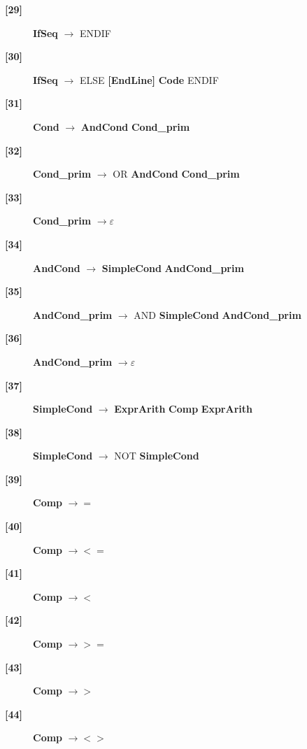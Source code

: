 \documentclass[12pt]{article}
\begin{document}
\begin{description}
\item[\textbf{[29]}]{ \textbf{\textlangle{}IfSeq\textrangle{}}  $\rightarrow$ ENDIF}
\item[\textbf{[30]}]{ \textbf{\textlangle{}IfSeq\textrangle{}}  $\rightarrow$ ELSE \textbf{[EndLine]} \textbf{\textlangle{}Code\textrangle{}}  ENDIF}
\item[\textbf{[31]}]{ \textbf{\textlangle{}Cond\textrangle{}}  $\rightarrow$ \textbf{\textlangle{}AndCond\textrangle{}}  \textbf{\textlangle{}Cond\_prim\textrangle{}} }
\item[\textbf{[32]}]{ \textbf{\textlangle{}Cond\_prim\textrangle{}}  $\rightarrow$ OR \textbf{\textlangle{}AndCond\textrangle{}}  \textbf{\textlangle{}Cond\_prim\textrangle{}} }
\item[\textbf{[33]}]{ \textbf{\textlangle{}Cond\_prim\textrangle{}}  $\rightarrow \varepsilon$}
\item[\textbf{[34]}]{ \textbf{\textlangle{}AndCond\textrangle{}}  $\rightarrow$ \textbf{\textlangle{}SimpleCond\textrangle{}}  \textbf{\textlangle{}AndCond\_prim\textrangle{}} }
\item[\textbf{[35]}]{ \textbf{\textlangle{}AndCond\_prim\textrangle{}}  $\rightarrow$ AND \textbf{\textlangle{}SimpleCond\textrangle{}}  \textbf{\textlangle{}AndCond\_prim\textrangle{}} }
\item[\textbf{[36]}]{ \textbf{\textlangle{}AndCond\_prim\textrangle{}}  $\rightarrow \varepsilon$}
\item[\textbf{[37]}]{ \textbf{\textlangle{}SimpleCond\textrangle{}}  $\rightarrow$ \textbf{\textlangle{}ExprArith\textrangle{}}  \textbf{\textlangle{}Comp\textrangle{}}  \textbf{\textlangle{}ExprArith\textrangle{}} }
\item[\textbf{[38]}]{ \textbf{\textlangle{}SimpleCond\textrangle{}}  $\rightarrow$ NOT \textbf{\textlangle{}SimpleCond\textrangle{}} }
\item[\textbf{[39]}]{ \textbf{\textlangle{}Comp\textrangle{}}  $\rightarrow =$}
\item[\textbf{[40]}]{ \textbf{\textlangle{}Comp\textrangle{}}  $\rightarrow <=$}
\item[\textbf{[41]}]{ \textbf{\textlangle{}Comp\textrangle{}}  $\rightarrow <$}
\item[\textbf{[42]}]{ \textbf{\textlangle{}Comp\textrangle{}}  $\rightarrow >=$}
\item[\textbf{[43]}]{ \textbf{\textlangle{}Comp\textrangle{}}  $\rightarrow >$ }
\item[\textbf{[44]}]{ \textbf{\textlangle{}Comp\textrangle{}}  $\rightarrow <>$ }

\end{description}
\end{document}
